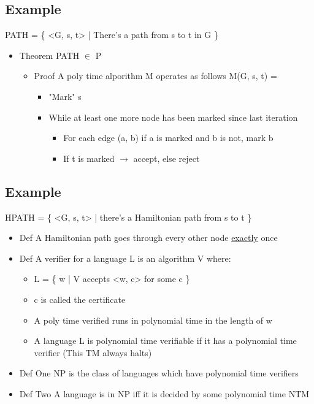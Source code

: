 \documentclass[11pt]{article}
\begin{document}
\subsection{Example}
\label{sec:orgf5a6317}
PATH = \{ <G, s, t> | There's a path from s to t in G \}
\begin{itemize}
\item Theorem
PATH \(\in\) P 
\begin{itemize}
\item Proof
A poly time alporithm M operates as follows
M(G, s, t) = 
\begin{itemize}
\item "Mark" s
\item While at least one more node has been marked since last iteration
\begin{itemize}
\item For each edge (a, b) if a is marked and b is not, mark b
\end{itemize}
\begin{itemize}
\item If t is marked \(\rightarrow\) accept, else reject
\end{itemize}
\end{itemize}
\end{itemize}
\end{itemize}
\subsection{Example}
\label{sec:orgdc6ccdb}
HPATH = \{ <G, s, t> | there's a Hamiltonian path from s to t \}
\begin{itemize}
\item Def
A Hamiltonian path goes through every other node \uline{exactly} once
\item Def
A verifier for a language L is an algorithm V where:
\begin{itemize}
\item L = \{ w | V accepts <w, c> for some c \}
\item c is called the certificate
\item A poly time verified runs in polynomial time in the length of w
\item A language L is polynomial time verifiable if it has a polynomial time verifier (This TM always halts)
\end{itemize}
\item Def One
NP is the class of languages which have polynomial time verifiers
\item Def Two
A language is in NP iff it is decided by some polynomial time NTM
\end{itemize}
\end{document}
